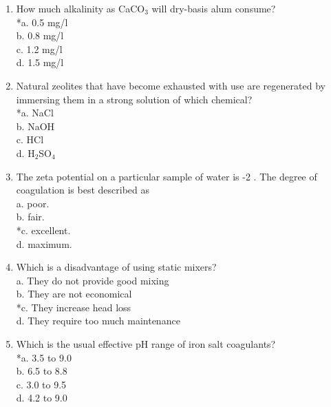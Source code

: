 \begin{enumerate}
  \item How much alkalinity as CaCO$_{3}$ will dry-basis alum consume?\\
*a. 0.5 mg/l\\
b. 0.8 mg/l\\
c. 1.2 mg/l\\
d. 1.5 mg/l\\
  \item Natural zeolites that have become exhausted with use are regenerated by immersing them in a strong solution of which chemical?\\
*a. NaCl\\
b. NaOH\\
c. HCl\\
d. H$_2$SO$_4$ \\
\item The zeta potential on a particular sample of water is -2 . The degree of coagulation is best described as\\
a. poor.\\
b. fair.\\
*c. excellent.\\
d. maximum.\\
  \item Which is a disadvantage of using static mixers?\\
a. They do not provide good mixing\\
b. They are not economical\\
*c. They increase head loss\\
d. They require too much maintenance\\
  \item Which is the usual effective pH range of iron salt coagulants?\\
*a. 3.5 to 9.0\\
b. 6.5 to 8.8\\
c. 3.0 to 9.5\\
d. 4.2 to 9.0\\


\end{enumerate}

